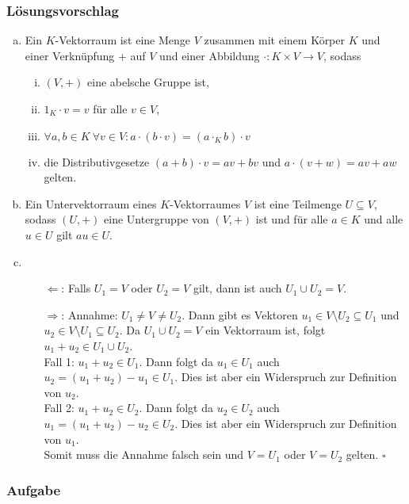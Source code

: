 \documentclass[a4paper,11pt]{scrartcl}
\newcounter{auf}
\newcommand{\Aufgabe}%
        {\addtocounter{auf}{1} \subsubsection*{\rmfamily  Aufgabe \theauf \hspace{1em}} }
\begin{document}
\subsubsection*{Lösungsvorschlag}
\begin{enumerate}[a)]
\item Ein $K$-Vektorraum ist eine Menge $V$ zusammen mit einem Körper $K$ und einer Verknüpfung $+$ auf $V$ und einer Abbildung $\cdot:K\times V \to V$, sodass
\begin{enumerate}[i)]
\item $(V,+)$ eine abelsche Gruppe ist,
\item $1_K\cdot v=v$ für alle $v\in V$,
\item $\forall a,b \in K \ \forall v \in V: a\cdot (b \cdot v)=(a\cdot_K b)\cdot v$
\item die Distributivgesetze $(a+b)\cdot v=av+bv$ und $a\cdot (v+w)=av+aw$ gelten.
\end{enumerate}
\item Ein Untervektorraum eines $K$-Vektorraumes $V$ ist eine Teilmenge $U \subseteq V$, sodass $(U,+)$ eine Untergruppe von $(V,+)$ ist und für alle $a\in K$ und alle $u\in U$ gilt $au \in U$.
\item 
\begin{itemize}
\item[$\Leftarrow$:] Falls $U_1=V$ oder $U_2=V$ gilt, dann ist auch $U_1\cup U_2=V$.
\item[$\Rightarrow$:] Annahme: $U_1\ne V \ne U_2$. Dann gibt es Vektoren $u_1 \in V\setminus U_2 \subseteq U_1$ und $u_2 \in V\setminus U_1 \subseteq U_2$. Da $U_1 \cup U_2=V$ ein Vektorraum ist, folgt $u_1+u_2 \in U_1\cup U_2$.\\
Fall 1: $u_1+u_2 \in U_1$. Dann folgt da $u_1 \in U_1$ auch $u_2=(u_1+u_2)-u_1 \in U_1$. Dies ist aber ein Widerspruch zur Definition von $u_2$.\\
Fall 2: $u_1+u_2 \in U_2$. Dann folgt da $u_2 \in U_2$ auch $u_1=(u_1+u_2)-u_2 \in U_2$. Dies ist aber ein Widerspruch zur Definition von $u_1$.\\
Somit muss die Annahme falsch sein und $V=U_1$ oder $V=U_2$ gelten. \hfill $\square$
\end{itemize}
\end{enumerate}

\newpage
\Aufgabe
\end{document}
